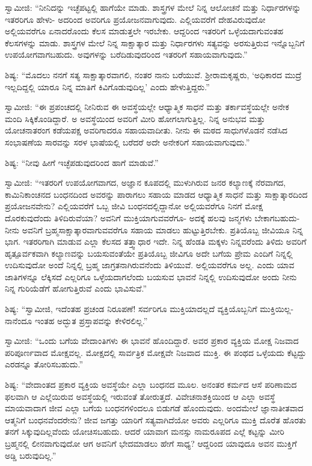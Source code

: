  ಸ್ವಾಮೀಜಿ: “ನೀನಿದನ್ನು ಇಚ್ಛೆಪಟ್ಟಲ್ಲಿ ಹಾಗೆಯೇ ಮಾಡು. ಶಾಸ್ತ್ರಗಳ ಮೇಲೆ ನಿನ್ನ ಆಲೋಚನೆ ಮತ್ತು ನಿರ್ಧಾರಗಳನ್ನು ಇತರರಿಗೂ ಹೇಳು- ಅದರಿಂದ ಅವರಿಗೂ ಪ್ರಯೋಜನವಾಗುವುದು. ಎಲ್ಲಿಯವರೆಗೆ ದೇಹವಿರುವುದೋ ಅಲ್ಲಿಯವರೆಗೂ ಏನಾದರೊಂದು ಕೆಲಸ ಮಾಡುತ್ತಲೇ ಇರಬೇಕು. ಆದ್ದರಿಂದ ಇತರರಿಗೆ ಒಳ್ಳೆಯದಾಗುವಂತಹ ಕೆಲಸಗಳನ್ನು ಮಾಡು. ಶಾಸ್ತ್ರಗಳ ಮೇಲೆ ನಿನ್ನ ಸಾಕ್ಷಾತ್ಕಾರ ಮತ್ತು ನಿರ್ಧಾರಗಳು ಸತ್ಯವನ್ನು ಅರಸುತ್ತಿರುವ ಇನ್ನೊಬ್ಬನಿಗೆ ಉಪಯೋಗವಾಗಬಹುದು. ಅವುಗಳನ್ನು ಬರೆದಿಡುವುದರಿಂದ ಇತರರಿಗೆ ಸಹಾಯವಾಗುವುದು.” 

 ಶಿಷ್ಯ: “ಮೊದಲು ನನಗೆ ಸತ್ಯ ಸಾಕ್ಷಾತ್ಕಾರವಾಗಲಿ, ನಂತರ ನಾನು ಬರೆಯುವೆ. ಶ‍್ರೀರಾಮಕೃಷ್ಣರು, ‘ಅಧಿಕಾರದ ಮುದ್ರೆ ಇಲ್ಲದಿದ್ದಲ್ಲಿ ಯಾರೂ ನಿನ್ನ ಮಾತಿಗೆ ಕಿವಿಗೊಡುವುದಿಲ್ಲ’ ಎಂದು ಹೇಳುತ್ತಿದ್ದರು.” 

 ಸ್ವಾಮೀಜಿ: “ಈ ಪ್ರಪಂಚದಲ್ಲಿ ನೀನಿರುವ ಈ ಅವಸ್ಥೆಯಲ್ಲೇ ಆಧ್ಯಾತ್ಮಿಕ ಸಾಧನೆ ಮತ್ತು ತರ್ಕಾವಸ್ಥೆಯಲ್ಲೇ ಅನೇಕ ಮಂದಿ ಸಿಕ್ಕಿಕೊಂಡಿದ್ದಾರೆ. ಅ ಅವಸ್ಥೆಯಿಂದ ಅವರಿಗೆ ಮೀರಿ ಹೋಗಲಾಗುತ್ತಿಲ್ಲ. ನಿನ್ನ ಅನುಭವ ಮತ್ತು ಯೋಚನಾತರಂಗ ಕಡೆಯಪಕ್ಷ ಅವರಿಗಾದರೂ ಸಹಾಯವಾದೀತು. ನೀನು ಈ ಮಠದ ಸಾಧುಗಳೊಡನೆ ನಡೆಸಿದ ಸಂಭಾಷಣೆಯ ಸಾರವನ್ನು ಸರಳ ಭಾಷೆಯಲ್ಲಿ ಬರೆದರೆ ಅದೇ ಅನೇಕರಿಗೆ ಸಹಾಯವಾಗುವುದು.” 

 ಶಿಷ್ಯ: “ನೀವು ಹೀಗೆ ಇಚ್ಛೆಪಡುವುದರಿಂದ ಹಾಗೆ ಮಾಡುವೆ.” 

 ಸ್ವಾಮೀಜಿ: “ಇತರರಿಗೆ ಉಪಯೋಗವಾಗದ, ಅಜ್ಞಾನ ಕೂಪದಲ್ಲಿ ಮುಳುಗಿರುವ ಜನರ ಕಲ್ಯಾಣಕ್ಕೆ ನೆರವಾಗದ, ಕಾಮಿನಿಕಾಂಚನದ ಬಂಧನದಿಂದ ಅವರನ್ನು ಪಾರಾಗಲು ಸಹಾಯ ಮಾಡದ ಆಧ್ಯಾತ್ಮಿಕ ಸಾಧನೆ ಮತ್ತು ಸಾಕ್ಷಾತ್ಕಾರದಿಂದ ಪ್ರಯೋಜನವೇನು? ಎಲ್ಲಿಯವರೆಗೆ ಒಬ್ಬ ಜೀವಿ ಬಂಧನದಲ್ಲಿದ್ದಾನೋ ಅಲ್ಲಿಯವರೆಗೂ ನಿನಗೆ ಮೋಕ್ಷ ದೊರಕುವುದೆಂದು ತಿಳಿದಿರುವೆಯಾ? ಅವನಿಗೆ ಮುಕ್ತಿಯಾಗುವವರೆಗೂ- ಅದಕ್ಕೆ ಹಲವು ಜನ್ಮಗಳು ಬೇಕಾಗಬಹುದು- ನೀನು ಅವನಿಗೆ ಬ್ರಹ್ಮಸಾಕ್ಷಾತ್ಕಾರವಾಗುವವರೆಗೂ ಸಹಾಯ ಮಾಡಲು ಹುಟ್ಟುತ್ತಿರಬೇಕು. ಪ್ರತಿಯೊಬ್ಬ ಜೀವಿಯೂ ನಿನ್ನ ಭಾಗ. ಇತರರಿಗಾಗಿ ಮಾಡುವ ಎಲ್ಲಾ ಕೆಲಸದ ತತ್ತ್ವಾಧಾರ ಇದೇ. ನಿನ್ನ ಹೆಂಡತಿ ಮಕ್ಕಳು ನಿನ್ನವರೆಂದು ತಿಳಿದು ಅವರಿಗೆ ಹೃತ್ಪೂರ್ವಕವಾಗಿ ಕಲ್ಯಾಣವನ್ನು ಬಯಸುವಂತೆಯೇ ಪ್ರತಿಯೊಬ್ಬ ಜೀವಿಗೂ ಅದೇ ಬಗೆಯ ಪ್ರೇಮ ಎಂದಿಗೆ ನಿನ್ನಲ್ಲಿ ಉದಿಸುವುದೋ ಅಂದೆ ನಿನ್ನಲ್ಲಿ ಬ್ರಹ್ಮ ಜಾಗ್ರತನಾಗಿರುವನೆಂದು ತಿಳಿಯುವೆ. ಅಲ್ಲಿಯವರೆಗೂ ಅಲ್ಲ. ಎಂದು ಯಾವ ಜಾತಿಗಳನ್ನೂ ಲೆಕ್ಕಿಸದೆ ಎಲ್ಲರಿಗೂ ಒಳ್ಳೆಯದಾಗಲೆಂದು ಬಯಸುವ ಭಾವನೆ ನಿನ್ನಲ್ಲಿ ಉದಿಸುವುದೋ ಅಂದು ನೀನು ನಿನ್ನ ಗುರಿಯೆಡೆಗೆ ಹೋಗುತ್ತಿರುವೆ ಎಂದು ಭಾವಿಸುವೆ.” 

 ಶಿಷ್ಯ: “ಸ್ವಾಮೀಜಿ, ಇದೆಂತಹ ಪ್ರಚಂಡ ನಿರೂಪಣೆ! ಸರ್ವರಿಗೂ ಮುಕ್ತಿಯಾದಲ್ಲದೆ ವ್ಯಕ್ತಿಯೊಬ್ಬನಿಗೆ ಮುಕ್ತಿಯಿಲ್ಲ- ನಾನೆಂದೂ ಇಂತಹ ಅದ್ಭುತ ಪ್ರಸ್ತಾಪವನ್ನು ಕೇಳಿರಲಿಲ್ಲ.” 

 ಸ್ವಾಮೀಜಿ: “ಒಂದು ಬಗೆಯ ವೇದಾಂತಿಗಳು ಈ ಭಾವನೆ ಹೊಂದಿದ್ದಾರೆ. ಅವರ ಪ್ರಕಾರ ವ್ಯಕ್ತಿಯ ಮೋಕ್ಷ ನಿಜವಾದ ಪರಿಪೂರ್ಣವಾದ ಮೋಕ್ಷವಲ್ಲ. ಮೋಕ್ಷದಲ್ಲಿ ಸಾರ್ವತ್ರಿಕ ಮೋಕ್ಷವೇ ನಿಜವಾದ ಮುಕ್ತಿ. ಈ ಪಂಥದ ಒಳ್ಳೆಯದು ಕೆಟ್ಟದ್ದು ಎರಡನ್ನೂ ತೋರಿಸಬಹುದು.” 

 ಶಿಷ್ಯ: “ವೇದಾಂತದ ಪ್ರಕಾರ ವ್ಯಕ್ತಿಯ ಅವಸ್ಥೆಯೇ ಎಲ್ಲಾ ಬಂಧನದ ಮೂಲ. ಅನಂತರ ಕರ್ಮದ ಆಸೆ ಪರಿಣಾಮದ ಫಲವಾಗಿ ಆ ಎಲ್ಲೆಯಿರುವ ಅವಸ್ಥೆಯಲ್ಲಿ ಇರುವಂತೆ ತೋರುತ್ತದೆ. ವಿವೇಚನಾಶಕ್ತಿಯಿಂದ ಆ ಎಲ್ಲಾ ಅವಸ್ಥೆ ಮಾಯವಾದಾಗ ಜೀವ ಎಲ್ಲಾ ಬಗೆಯ ಬಂಧನಗಳಿಂದಲೂ ಬಿಡುಗಡೆ ಹೊಂದುವುದು. ಅಂದಮೇಲೆ ಜ್ಞಾನಾತೀತವಾದ ಆತ್ಮನಿಗೆ ಬಂಧನವೆಂದರೇನು? ಜೀವ ಜಗತ್ತು ಯಾರಿಗೆ ಸತ್ಯವಾಗಿದೆಯೋ ಅವರು ಎಲ್ಲರಿಗೂ ಮುಕ್ತಿ ದೊರೆತ ಹೊರತು ತನಗೆ ಸಿಕ್ಕುವುದಿಲ್ಲವೆಂದು ಯೋಚಿಸಬಹುದು. ಆದರೆ ಯಾವಾಗ ಮನಸ್ಸು ನಾಮರೂಪದ ಎಲ್ಲೆ ಕಟ್ಟನ್ನು ಮೀರಿ ಬ್ರಹ್ಮನಲ್ಲಿ ಲೀನವಾಗುವುದೋ ಆಗ ಅವನಿಗೆ ಭೇದಮಾಡಲು ಹೇಗೆ ಸಾಧ್ಯ? ಆದ್ದರಿಂದ ಯಾವುದೂ ಅವನ ಮುಕ್ತಿಗೆ ಅಡ್ಡಿ ಬರುವುದಿಲ್ಲ.” 

